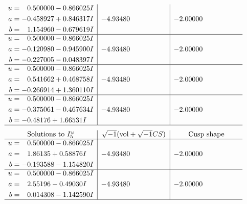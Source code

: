 \documentclass[1p]{elsarticle_modified}
\theoremstyle{definition}
\newcommand{\I}{\sqrt{-1}}
\begin{document}
$$\begin{array}{c|c|c}
\begin{aligned}
u &= \phantom{-}0.500000 - 0.866025 I \\
a &= -0.458927 + 0.846317 I \\
b &= \phantom{-}1.154960 - 0.679619 I\end{aligned}
 & -4.93480\phantom{ +0.000000I} & -2.00000\phantom{ +0.000000I} \\ \hline\begin{aligned}
u &= \phantom{-}0.500000 - 0.866025 I \\
a &= -0.120980 - 0.945900 I \\
b &= -0.227005 - 0.048397 I\end{aligned}
 & -4.93480\phantom{ +0.000000I} & -2.00000\phantom{ +0.000000I} \\ \hline\begin{aligned}
u &= \phantom{-}0.500000 - 0.866025 I \\
a &= \phantom{-}0.541662 + 0.468758 I \\
b &= -0.266914 + 1.360110 I\end{aligned}
 & -4.93480\phantom{ +0.000000I} & -2.00000\phantom{ +0.000000I} \\ \hline\begin{aligned}
u &= \phantom{-}0.500000 - 0.866025 I \\
a &= -0.375061 - 0.467634 I \\
b &= -0.48176 + 1.66531 I\end{aligned}
 & -4.93480\phantom{ +0.000000I} & -2.00000\phantom{ +0.000000I}\\
 \hline 
 \end{array}$$\newpage$$\begin{array}{c|c|c}  
\text{Solutions to }I^u_{5}& \I (\text{vol} + \sqrt{-1}CS) & \text{Cusp shape}\\
 \hline 
\begin{aligned}
u &= \phantom{-}0.500000 - 0.866025 I \\
a &= \phantom{-}1.86135 + 0.58876 I \\
b &= -0.193588 - 1.154820 I\end{aligned}
 & -4.93480\phantom{ +0.000000I} & -2.00000\phantom{ +0.000000I} \\ \hline\begin{aligned}
u &= \phantom{-}0.500000 - 0.866025 I \\
a &= \phantom{-}2.55196 - 0.49030 I \\
b &= \phantom{-}0.014308 - 1.142590 I\end{aligned}
 & -4.93480\phantom{ +0.000000I} & -2.00000\phantom{ +0.000000I}\\
 \hline 
 \end{array}$$\newpage\newpage\renewcommand{\arraystretch}{1}
\end{document}
